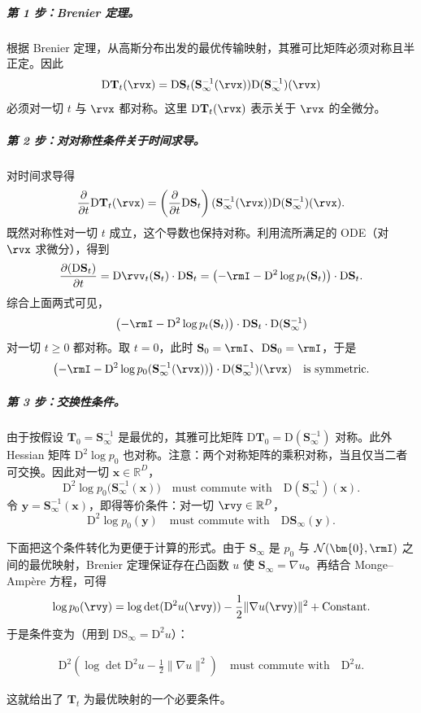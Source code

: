 \subparagraph{第 1 步：Brenier 定理。} 根据 Brenier 定理，从高斯分布出发的最优传输映射，其雅可比矩阵必须对称且半正定。因此
\[
\mathrm{D} \mathbf{T}_t(\rvx) = \mathrm{D} \mathbf{S}_t(\mathbf{S}_\infty^{-1}(\rvx)) \mathrm{D} (\mathbf{S}_\infty^{-1})(\rvx)
\]
必须对一切 $t$ 与 $\rvx$ 都对称。这里 $\mathrm{D} \mathbf{T}_t(\rvx)$ 表示关于 $\rvx$ 的全微分。

\subparagraph{第 2 步：对对称性条件关于时间求导。}
对时间求导得
\[
\frac{\partial}{\partial t} \mathrm{D}\mathbf{T}_t(\rvx)
= \left( \frac{\partial}{\partial t} \mathrm{D} \mathbf{S}_t \right)(\mathbf{S}_\infty^{-1}(\rvx)) \mathrm{D} (\mathbf{S}_\infty^{-1})(\rvx).
\]
既然对称性对一切 $t$ 成立，这个导数也保持对称。利用流所满足的 ODE（对 $\rvx$ 求微分），得到
\[
\frac{\partial (\mathrm{D}\mathbf{S}_t)}{\partial t}
= \mathrm{D}\rvv_t(\mathbf{S}_t) \cdot \mathrm{D}\mathbf{S}_t
= \left( -\rmI - \mathrm{D}^2 \log p_t(\mathbf{S}_t) \right) \cdot \mathrm{D}\mathbf{S}_t.
\]
综合上面两式可见，
\[
\left( -\rmI - \mathrm{D}^2 \log p_t(\mathbf{S}_t) \right) \cdot\mathrm{D}\mathbf{S}_t \cdot \mathrm{D} (\mathbf{S}_\infty^{-1})
\]
对一切 $t\geq 0$ 都对称。取 $t = 0$，此时 $\mathbf{S}_0 = \rmI$、$\mathrm{D}\mathbf{S}_0 = \rmI$，于是
\[
\left( -\rmI - \mathrm{D}^2 \log p_0(\mathbf{S}_\infty^{-1}(\rvx)) \right) \cdot \mathrm{D} (\mathbf{S}_\infty^{-1})(\rvx) \quad \text{is symmetric}.
\]

\subparagraph{第 3 步：交换性条件。} 由于按假设 $\mathbf{T}_0 = \mathbf{S}_\infty^{-1}$ 是最优的，其雅可比矩阵 $\mathrm{D}\mathbf{T}_0 = \mathrm{D}(\mathbf{S}_\infty^{-1})$ 对称。此外 Hessian 矩阵 $\mathrm{D}^2\log p_0$ 也对称。注意：两个对称矩阵的乘积对称，当且仅当二者可交换。因此对一切 $\mathbf{x}\in\mathbb{R}^D$，
\[
\mathrm{D}^2\log p_0\bigl(\mathbf{S}_\infty^{-1}(\mathbf{x})\bigr)
\quad\text{must commute with}\quad
\mathrm{D}(\mathbf{S}_\infty^{-1})(\mathbf{x}) .
\]
令 $\mathbf{y}=\mathbf{S}_\infty^{-1}(\mathbf{x})$，即得等价条件：对一切 $\rvy\in\mathbb{R}^D$，
\[
\mathrm{D}^2\log p_0(\mathbf{y})
\quad\text{must commute with}\quad
\mathrm{D}\mathbf{S}_\infty(\mathbf{y}) .
\]


下面把这个条件转化为更便于计算的形式。由于 $\mathbf{S}_\infty$ 是 $p_0$ 与 $\mathcal{N}(\bm{0},\rmI)$ 之间的最优映射，Brenier 定理保证存在凸函数 $u$ 使 $\mathbf{S}_\infty = \nabla u$。再结合 Monge--Ampère 方程，可得
\[
\log p_0(\rvy) = \log \det(\mathrm{D}^2 u(\rvy)) - \frac{1}{2} \|\nabla u(\rvy)\|^2 + \text{Constant}.
\]
于是条件变为（用到 $\mathrm{D}\mathrm{S}_\infty = \mathrm{D}^2 u$）：
\begin{mdframed}
\begin{align}\label{eq:necessary-ot}
\mathrm{D}^2 \left(\log \det \mathrm{D}^2 u - \frac{1}{2} \|\nabla u\|^2\right)
\quad\text{must commute with}\quad
\mathrm{D}^2 u.
\end{align}
\end{mdframed}
这就给出了 $\mathbf{T}_t$ 为最优映射的一个必要条件。

